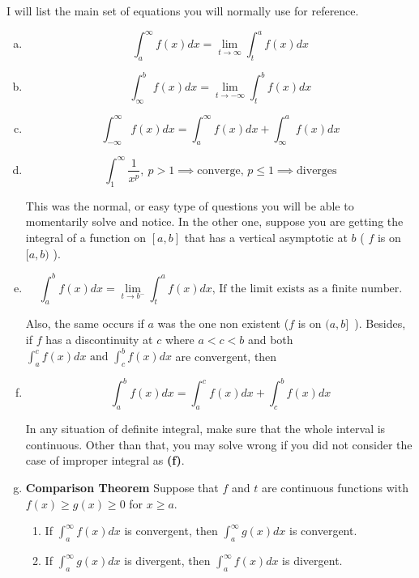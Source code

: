 \documentclass{article}
\begin{document}
	I will list the main set of equations you will normally use for reference.

	\begin{enumerate}[a.]
		\item $$\int^{\infty}_{a} f(x) dx = \lim_{t \to \infty} \int^{a}_{t} f(x) dx   $$
		\item $$\int^{b}_{\infty} f(x) dx = \lim_{t \to -\infty} \int^{b}_{t} f(x) dx  $$
		\item 
			$$ \int^{\infty}_{-\infty} f(x) dx =
			\int^{\infty}_{a} f(x) dx + \int^{a}_{\infty} f(x) dx 
			$$
		\item $$ \int^{\infty}_{1} \frac{1}{x^p} ,\ p>1 \implies \text{converge, } p 	\leq 1 \implies \text{diverges} $$


			This was the normal, or easy type of questions you will be able to momentarily solve and notice. In the other one, suppose you are getting the integral of a function on $ [a,b] $ that has a vertical asymptotic at $ b $ ( $ f $ is on $[a,b)$ ). 

		\item $$ \int^{b}_{a} f(x) dx = \lim_{t 	\to b^-	} \int^{a}_{t} f(x) dx \text{,  If the limit exists as a finite number.}  $$

			Also, the same occurs if $ a $ was the one non existent ($f$ is on $ (a,b]$\ ). Besides, if $ f $ has a discontinuity at $ c $ where $ a<c<b $ and both $ \int^{c}_{a} f(x) dx \text{ and } \int^{b}_{c} f(x) dx   $ are convergent, then 
		\item \[
				\int^{b}_{a} f(x) dx =
				\int^{c}_{a} f(x) dx + \int^{b}_{c} f(x) dx 
			\]

			In any situation of definite integral, make sure that the whole interval is continuous. Other than that, you may solve wrong if you did not consider the case of improper integral as \textbf{(f)}.

		\item \textbf{Comparison Theorem}  
			Suppose that $f$ and $t$ are continuous functions with $f(x) 	\geq g(x) 	\geq  0$ for $x \geq  a$.
			\begin{enumerate}[1.]
				\item If $\int^{\infty}_{a} f(x) dx$  is convergent, then $ \int^{\infty}_{a} g(x) dx   $  is convergent.
				\item
					If $\int^{\infty}_{a} g(x) dx$  is divergent, then $ \int^{\infty}_{a} f(x) dx   $  is divergent.
			\end{enumerate}
	\end{enumerate}
\end{document}
